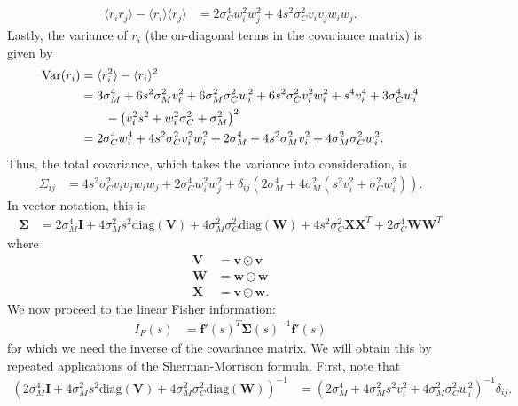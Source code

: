 \documentclass[11pt]{article}
\begin{document}
	\begin{align}
	\langle r_i r_j \rangle - \langle r_i \rangle \langle r_j \rangle &= 2 \sigma_C^4 w_i^2 w_j^2 + 4s^2 \sigma_C^2 v_i v_j w_i w_j.
	\end{align}
	Lastly, the variance of $r_i$ (the on-diagonal terms in the covariance matrix) is given by 
	\begin{align}
	\text{Var}(r_i) &= \langle r_i^2 \rangle - \langle r_i\rangle^2 \\
	&= 3\sigma_M^4 + 6s^2\sigma_M^2  v_i^2  +6 \sigma_M^2 \sigma_C^2  w_i^2+  6s^2 \sigma_C^2 v_i^2 w_i^2+ s^4 v_i^4 + 3\sigma_C^4 w_i^4 \notag \\ 
	& \qquad -\left(v_i^2 s^2 + w_i^2 \sigma_C^2 + \sigma_M^2\right)^2 \\
	&= 2\sigma_C^4 w_i^4 + 4s^2 \sigma_C^2 v_i^2 w_i^2 + 2\sigma_M^4 + 4s^2 \sigma_M^2 v_i^2  + 4\sigma_M^2\sigma_C^2 w_i^2.
	\end{align}
	Thus, the total covariance, which takes the variance into consideration, is 
	\begin{align}
	\Sigma_{ij} &= 4 s^2 \sigma_C^2 v_i v_j w_i w_j + 2 \sigma_C^4 w_i^2 w_j^2 + \delta_{ij} \left(2 \sigma_M^4 + 4\sigma_M^2 (s^2 v_i^2 + \sigma_C^2 w_i^2)\right).
	\end{align}
	In vector notation, this is 
	\begin{align}
	\boldsymbol{\Sigma} &= 2\sigma_M^4 \mathbf{I} +4\sigma_M^2 s^2 \text{diag}(\mathbf{V}) + 4\sigma_M^2 \sigma_C^2 \text{diag}(\mathbf{W}) + 4s^2 \sigma_C^2 \mathbf{X}\mathbf{X}^T + 2 \sigma_C^4 \mathbf{W}\mathbf{W}^T
	\end{align}
	where
	\begin{align}
		\mathbf{V} &= \mathbf{v} \odot \mathbf{v}\\
		\mathbf{W} &= \mathbf{w} \odot \mathbf{w}\\
		\mathbf{X} &= \mathbf{v} \odot \mathbf{w}.
	\end{align}
	We now proceed to the linear Fisher information:
	\begin{align}
	I_F(s) &= \mathbf{f}'(s)^T \boldsymbol{\Sigma}(s)^{-1} \mathbf{f}'(s)
	\end{align}
	for which we need the inverse of the covariance matrix. We will obtain this by repeated applications of the Sherman-Morrison formula. First, note that 
	\begin{align}
	\left(2\sigma_M^4 \mathbf{I} +4\sigma_M^2 s^2 \text{diag}(\mathbf{V}) + 4\sigma_M^2 \sigma_C^2 \text{diag}(\mathbf{W})\right)^{-1} &= \left(2\sigma_M^4 + 4\sigma_M^2 s^2 v_i^2 + 4\sigma_M^2 \sigma_C^2 w_i^2\right)^{-1}\delta_{ij}.
	\end{align}
\end{document}
